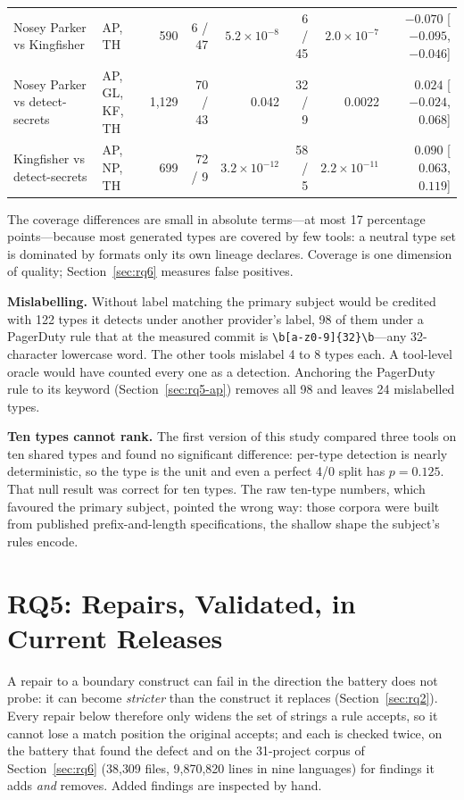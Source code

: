 \documentclass[10pt,journal,compsoc]{IEEEtran}
\begin{document}
\begin{table}[t]
\begin{tabular}{@{}llrrrrrr@{}}
Nosey Parker vs Kingfisher & AP, TH & 590 & 6 / 47 & $5.2\times10^{-8}$ & 6 / 45 & $2.0\times10^{-7}$ & $-0.070$ [$-0.095$, $-0.046$] \\
Nosey Parker vs detect-secrets & AP, GL, KF, TH & 1{,}129 & 70 / 43 & 0.042 & 32 / 9 & 0.0022 & $0.024$ [$-0.024$, $0.068$] \\
Kingfisher vs detect-secrets & AP, NP, TH & 699 & 72 / 9 & $3.2\times10^{-12}$ & 58 / 5 & $2.2\times10^{-11}$ & $0.090$ [$0.063$, $0.119$] \\
\bottomrule
\end{tabular}
\end{table}

The coverage differences are small in absolute terms---at most 17 percentage points---because most generated types are covered by few tools: a neutral type set is dominated by formats only its own lineage declares. Coverage is one dimension of quality; Section~\ref{sec:rq6} measures false positives.

\textbf{Mislabelling.} Without label matching the primary subject would be credited with 122 types it detects under another provider's label, 98 of them under a PagerDuty rule that at the measured commit is \verb|\b[a-z0-9]{32}\b|---any 32-character lowercase word. The other tools mislabel 4 to 8 types each. A tool-level oracle would have counted every one as a detection. Anchoring the PagerDuty rule to its keyword (Section~\ref{sec:rq5-ap}) removes all 98 and leaves 24 mislabelled types.

\textbf{Ten types cannot rank.} The first version of this study compared three tools on ten shared types and found no significant difference: per-type detection is nearly deterministic, so the type is the unit and even a perfect 4/0 split has $p=0.125$. That null result was correct for ten types. The raw ten-type numbers, which favoured the primary subject, pointed the wrong way: those corpora were built from published prefix-and-length specifications, the shallow shape the subject's rules encode.

\section{RQ5: Repairs, Validated, in Current Releases}
\label{sec:rq5}

A repair to a boundary construct can fail in the direction the battery does not probe: it can become \emph{stricter} than the construct it replaces (Section~\ref{sec:rq2}). Every repair below therefore only widens the set of strings a rule accepts, so it cannot lose a match position the original accepts; and each is checked twice, on the battery that found the defect and on the 31-project corpus of Section~\ref{sec:rq6} (38{,}309 files, 9{,}870{,}820 lines in nine languages) for findings it adds \emph{and} removes. Added findings are inspected by hand.
\end{document}
